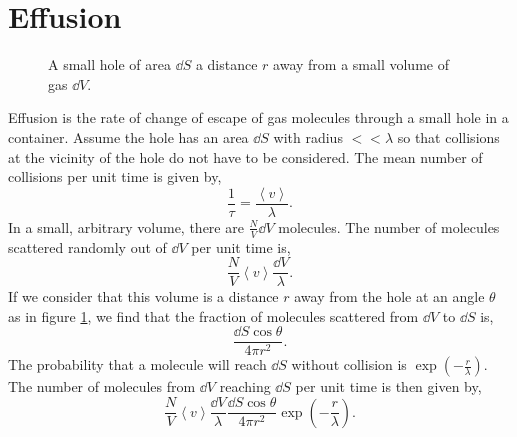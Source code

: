 \documentclass{book}
\begin{document}
\section{Effusion}
\begin{figure}
	\centering
	\caption{A small hole of area $\dd{S}$ a distance $r$ away from a small volume of gas $\dd{V}$.}
	\label{fig:effusion}
\end{figure}
Effusion is the rate of change of escape of gas molecules through a small hole in a container. Assume the hole has an area $\dd{S}$ with radius $<< \lambda$ so that collisions at the vicinity of the hole do not have to be considered. The mean number of collisions per unit time is given by,
\begin{equation}
	\frac{1}{\tau} = \frac{\left<v\right>}{\lambda}.
\end{equation}
In a small, arbitrary volume, there are $\frac{N}{V}\dd{V}$ molecules. The number of molecules scattered randomly out of $\dd{V}$ per unit time is,
\begin{equation}
	\frac{N}{V}\left<v\right> \frac{\dd{V}}{\lambda}.
\end{equation}
If we consider that this volume is a distance $r$ away from the hole at an angle $\theta$ as in figure \ref{fig:effusion}, we find that the fraction of molecules scattered from $\dd{V}$ to $\dd{S}$ is,
\begin{equation}
	\frac{\dd{S}\cos\theta}{4\pi r^2}.
\end{equation}
The probability that a molecule will reach $\dd{S}$ without collision is $\exp\left(-\frac{r}{\lambda}\right)$. The number of molecules from $\dd{V}$ reaching $\dd{S}$ per unit time is then given by,
\begin{equation}
	\frac{N}{V}\left<v\right>\frac{\dd{V}}{\lambda}\frac{\dd{S}\cos\theta}{4\pi r^2}\exp\left(-\frac{r}{\lambda}\right).
\end{equation}
\end{document}
